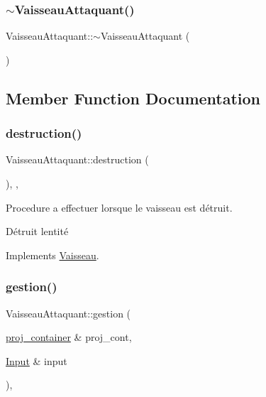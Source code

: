 \subsubsection{\texorpdfstring{$\sim$\+Vaisseau\+Attaquant()}{~VaisseauAttaquant()}}
{\footnotesize\ttfamily Vaisseau\+Attaquant\+::$\sim$\+Vaisseau\+Attaquant (\begin{DoxyParamCaption}{ }\end{DoxyParamCaption})\hspace{0.3cm}{\ttfamily [inline]}}



\subsection{Member Function Documentation}
\mbox{\label{class_vaisseau_attaquant_a9afe1d07b85b6064c802205a1d0d777b}} 
\subsubsection{\texorpdfstring{destruction()}{destruction()}}
{\footnotesize\ttfamily Vaisseau\+Attaquant\+::destruction (\begin{DoxyParamCaption}{ }\end{DoxyParamCaption})\hspace{0.3cm}{\ttfamily [inline]}, {\ttfamily [override]}, {\ttfamily [virtual]}}



Procedure a effectuer lorsque le vaisseau est détruit. 

Détruit l\textquotesingle{}entité 

Implements \mbox{\hyperlink{class_vaisseau_a6d7506acb12c0367989066c899ec7949}{Vaisseau}}.

\mbox{\label{class_vaisseau_attaquant_aaa30cf9a9cd4319bbf418799019284d7}} 
\subsubsection{\texorpdfstring{gestion()}{gestion()}}
{\footnotesize\ttfamily Vaisseau\+Attaquant\+::gestion (\begin{DoxyParamCaption}\item[{\mbox{\hyperlink{def__type_8h_a87980cd8ee9533e561a73e8bbc728188}{proj\+\_\+container}} \&}]{proj\+\_\+cont,  }\item[{\mbox{\hyperlink{_input_8h_a5588d60d674991c719a8df848313e966}{Input}} \&}]{input }\end{DoxyParamCaption})\hspace{0.3cm}{\ttfamily [override]}, {\ttfamily [virtual]}}



